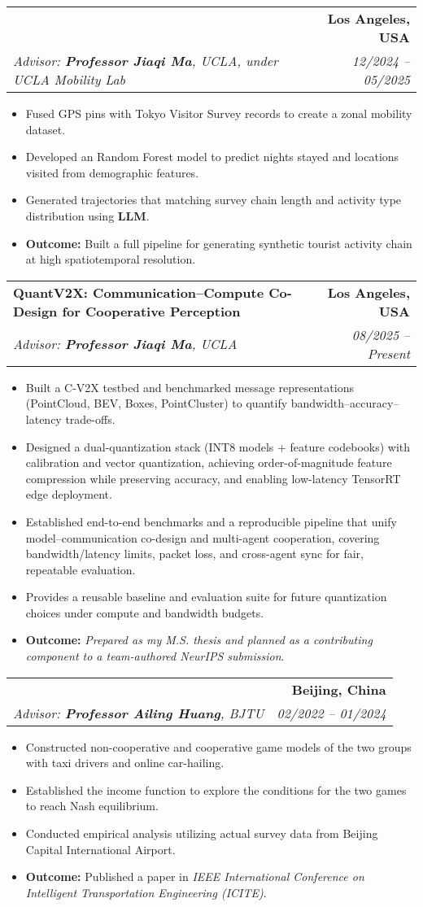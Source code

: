 \documentclass[letterpaper,11pt]{article}
\makeatletter
\newcommand{\resumeItem}[1]{
  \item\small{
    {#1 \vspace{-2pt}}
  }
}
\newcommand{\resumeSubheading}[4]{
  \vspace{-2pt}\item
    \begin{tabular*}{1.0\textwidth}[t]{l@{\extracolsep{\fill}}r}
      \textbf{#1} & \textbf{\small #2} \\
      \textit{\small#3} & \textit{\small #4} \\
    \end{tabular*}\vspace{-7pt}
}
\newcommand{\resumeItemListStart}{\begin{itemize}}
\newcommand{\resumeItemListEnd}{\end{itemize}\vspace{-5pt}}
\makeatother
\begin{document}
\resumeSubheading
{\makebox[0.6\textwidth][l]{\textbf{\textls[-0]{Tourist Mobility Modeling for Tokyo via Survey Data}}}}{Los Angeles, USA}
{\textit{Advisor: \textbf{Professor Jiaqi Ma}, UCLA, under UCLA Mobility Lab}}{\textit{12/2024 -- 05/2025}}
\resumeItemListStart
    \resumeItem{Fused GPS pins with Tokyo Visitor Survey records to create a zonal mobility dataset.}
    \resumeItem{Developed an Random Forest model to predict nights stayed and locations visited from demographic features.}
    \resumeItem{Generated trajectories that matching survey chain length and activity type distribution using \textbf{LLM}.}
    \resumeItem{\textbf{Outcome:} Built a full pipeline for generating synthetic tourist activity chain at high spatiotemporal resolution.}
\resumeItemListEnd
\vspace{-5pt}

\resumeSubheading
{QuantV2X: Communication–Compute Co-Design for Cooperative Perception}{Los Angeles, USA}
{\textit{Advisor: \textbf{Professor Jiaqi Ma}, UCLA}}{\textit{08/2025 -- Present}}
\resumeItemListStart
    \resumeItem{Built a C-V2X testbed and benchmarked message representations (PointCloud, BEV, Boxes, PointCluster) to quantify bandwidth–accuracy–latency trade-offs.}
    \resumeItem{Designed a dual-quantization stack (INT8 models + feature codebooks) with calibration and vector quantization, achieving order-of-magnitude feature compression while preserving accuracy, and enabling low-latency TensorRT edge deployment.}
    \resumeItem{Established end-to-end benchmarks and a reproducible pipeline that unify model–communication co-design and multi-agent cooperation, covering bandwidth/latency limits, packet loss, and cross-agent sync for fair, repeatable evaluation.}
    \resumeItem{Provides a reusable baseline and evaluation suite for future quantization choices under compute and bandwidth budgets.}
    \resumeItem{\textbf{Outcome:} \textit{Prepared as my M.S. thesis and planned as a contributing component to a team-authored NeurIPS submission}.}
\resumeItemListEnd

\resumeSubheading
{\makebox[0.6\textwidth][l]{\textbf{\textls[-0]{Game Models for Taxi Decision-Making Considering Online Ride-Hailing Competition}}}}{Beijing, China}
{\textit{Advisor: \textbf{Professor Ailing Huang}, BJTU}}{\textit{02/2022 -- 01/2024}}
\resumeItemListStart
    \resumeItem{Constructed non-cooperative and cooperative game models of the two groups with taxi drivers and online car-hailing.}
    \resumeItem{Established the income function to explore the conditions for the two games to reach Nash equilibrium.}
    \resumeItem{Conducted empirical analysis utilizing actual survey data from Beijing Capital International Airport.}
    \resumeItem{\textbf{Outcome:} Published a paper in \textit{IEEE International Conference on Intelligent Transportation Engineering (ICITE)}.}
\resumeItemListEnd
\vspace{-5pt}
\end{document}
